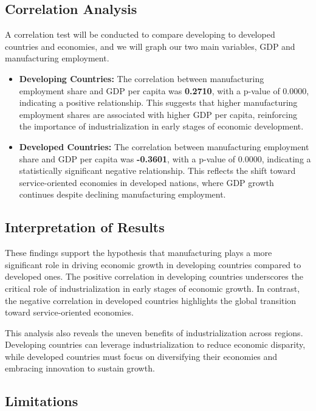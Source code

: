\documentclass[12pt]{article}
\begin{document}
\subsection{Correlation Analysis}
A correlation test will be conducted to compare developing to developed countries and economies, and we will graph our two main variables, GDP and manufacturing employment.
\begin{itemize}
\item \textbf{Developing Countries:} The correlation between manufacturing employment share and GDP per capita was \textbf{0.2710}, with a p-value of 0.0000, indicating a positive relationship. This suggests that higher manufacturing employment shares are associated with higher GDP per capita, reinforcing the importance of industrialization in early stages of economic development.
\item \textbf{Developed Countries:} The correlation between manufacturing employment share and GDP per capita was \textbf{-0.3601}, with a p-value of 0.0000, indicating a statistically significant negative relationship. This reflects the shift toward service-oriented economies in developed nations, where GDP growth continues despite declining manufacturing employment.
\end{itemize}


\subsection{Interpretation of Results}

These findings support the hypothesis that manufacturing plays a more significant role in driving economic growth in developing countries compared to developed ones. The positive correlation in developing countries underscores the critical role of industrialization in early stages of economic growth. In contrast, the negative correlation in developed countries highlights the global transition toward service-oriented economies.

This analysis also reveals the uneven benefits of industrialization across regions. Developing countries can leverage industrialization to reduce economic disparity, while developed countries must focus on diversifying their economies and embracing innovation to sustain growth.

\subsection{Limitations}
\end{document}
